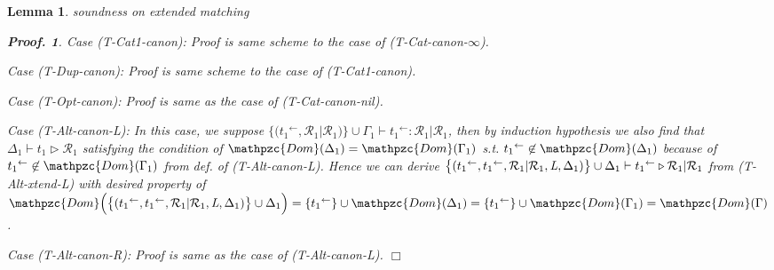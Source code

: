 \documentclass[12pt]{article}
\newtheorem{Lemma}{Lemma}[section]
\newtheorem{Proof}{Proof.}
\begin{document}
\begin{Lemma}{soundness on extended matching}
\begin{Proof}
    Case (T-Cat1-canon): Proof is same scheme to the case of
    (T-Cat-canon-$\infty$).
    
    Case (T-Dup-canon): Proof is same scheme to the case of (T-Cat1-canon).

    Case (T-Opt-canon): Proof is same as the case of (T-Cat-canon-nil).

    Case (T-Alt-canon-L): In this case, we suppose
    $\bigl\{({t_1}^\leftarrow, \mathcal{R}_1 | \mathcal{R}_1) \bigr\} \cup
    \Gamma_1 \vdash {t_1}^\leftarrow: \mathcal{R}_1 | \mathcal{R}_1$, then
    by induction hypothesis we also find that
    $\Delta_1 \vdash t_1 \triangleright \mathcal{R}_1$ satisfying the
    condition of $\mathpzc{Dom}(\Delta_1) = \mathpzc{Dom}(\Gamma_1)$ s.t.
    ${t_1}^\leftarrow \not\in \mathpzc{Dom}(\Delta_1)$ because of
    ${t_1}^\leftarrow \not\in \mathpzc{Dom}(\Gamma_1)$ from
    def. of (T-Alt-canon-L). Hence we can derive
    $\bigl\{({t_1}^\leftarrow, {t_1}^\leftarrow,
    \mathcal{R}_1 | \mathcal{R}_1, \text{\it L}, \Delta_1) \bigr\} \cup
    \Delta_1 \vdash {t_1}^\leftarrow \triangleright
    \mathcal{R}_1 | \mathcal{R}_1$ from (T-Alt-xtend-L) with desired
    property of
    $\mathpzc{Dom}\Bigl(\bigl\{({t_1}^\leftarrow, {t_1}^\leftarrow,
    \mathcal{R}_1 | \mathcal{R}_1, \text{\it L}, \Delta_1) \bigr\} \cup
    \Delta_1 \Bigr) =
    \{{t_1}^\leftarrow\} \cup \mathpzc{Dom}(\Delta_1) =
    \{{t_1}^\leftarrow\} \cup \mathpzc{Dom}(\Gamma_1) =
    \mathpzc{Dom}(\Gamma)$.

    Case (T-Alt-canon-R): Proof is same as the case of (T-Alt-canon-L).
    $\Box$
  \end{Proof}      
\end{Lemma}
\end{document}

